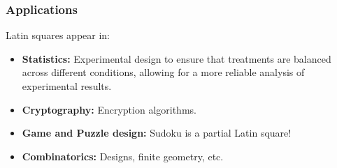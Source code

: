 \documentclass{beamer}
\begin{document}





\begin{frame}
\frametitle{Applications}
Latin squares appear in:
\begin{itemize}
  \item \textbf{Statistics:} Experimental design to ensure that treatments are balanced across different conditions, allowing for a more reliable analysis of experimental results.
  \item \textbf{Cryptography:} Encryption algorithms.
  \item \textbf{Game and Puzzle design:} Sudoku is a partial Latin square!
  \item \textbf{Combinatorics:} Designs, finite geometry, etc.
\end{itemize}
\end{frame}
\end{document}

